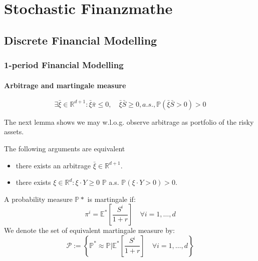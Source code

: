 \chapter{Stochastic Finanzmathe}
\section{Discrete Financial Modelling}
\subsection{1-period Financial Modelling}
\subsubsection{Arbitrage and martingale measure}
\begin{definition}
\begin{equation*}
	\exists \bar{\xi} \in \mathbb{R}^{d+1}: \bar{\xi} \bar{\pi} \leq 0, \quad \bar{\xi} \bar{S} \geq 0, a.s., \mathbb{P}(\bar{\xi} \bar{S} > 0) > 0
\end{equation*}
\end{definition}


The next lemma shows we may w.l.o.g. observe arbitrage as portfolio of the risky assets. 
\begin{lemma}
	The following arguments are equivalent 
	\begin{itemize}
		\item there exists an arbitrage $\bar{\xi} \in \mathbb{R}^{d+1}$. 
		\item there exists $\xi \in \mathbb{R}^d: \xi \cdot Y \ge 0$ $\mathbb{P}$ a.s. $\mathbb{P}( \xi \cdot Y > 0) >0$. 
	\end{itemize}
\end{lemma}

\begin{definition}
A probability measure $\mathbb{P}*$ is martingale if:
\begin{equation*}
	\pi^i = \mathbb{E}^*\left[\frac{S^i}{1 + r}\right] \quad \forall i = 1, \dots, d
\end{equation*}
We denote the set of equivalent martingale measure by:
\begin{equation*}
	\mathcal{P}:= \left\{\mathbb{P}^* \approx \mathbb{P}| \mathbb{E}^*\left[\frac{S^i}{1 + r}\right] \quad \forall i = 1, \dots, d \right\}
\end{equation*}
\end{definition}

